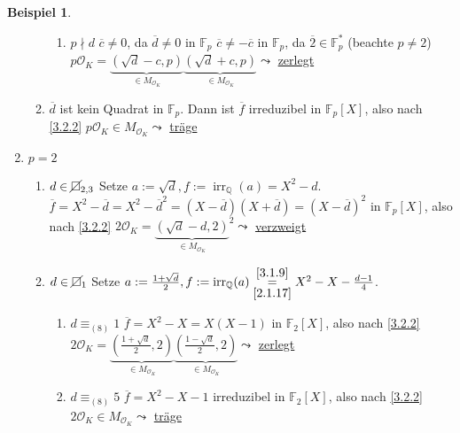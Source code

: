 \documentclass[
twoside=semi,
fontsize=12,
DIV=12, 
cleardoublepage=current,
leqno,
headings=optiontoheadandtoc, 
toc=idx
]{scrbook}
\newcommand{\Q}{\mathbb{Q}}
\newcommand{\F}{\mathbb{F}}
\newcommand{\nsquare}{\cancel{\square}}
\newcommand{\brac}[1]{\left( #1 \right)}
\DeclareMathOperator{\irr}{irr}
\theoremstyle{definition}
\newtheorem{beispiel}[definition]{Beispiel}
\begin{document}
\begin{beispiel}
\begin{enumerate}[label = \underline{Fall \arabic*}]
\begin{enumerate}[label = \underline{Fall 1.\arabic*}]
\begin{enumerate}[label = \underline{Fall 1.1.\arabic*}]
					\item $p\nmid d$\newline
					$\overline{c} \neq 0$, da $\overline{d} \neq 0$ in $\F_p$\newline
					$\overline{c} \neq -\overline{c}$ in $\F_p$, da $\overline{2} \in \F_p^*$ (beachte $p \neq 2$)\newline
					$p\mathcal{O}_K = \underbrace{(\sqrt{d} - c, p)}_{\in M_{\mathcal{O}_K}}\underbrace{(\sqrt{d} + c, p)}_{\in M_{\mathcal{O}_K}} \leadsto$ \underline{zerlegt} 
				\end{enumerate}
				\item $\overline{d}$ ist kein Quadrat in $\F_p$.\newline
				Dann ist $\overline{f}$ irreduzibel in $\F_p[X]$, also nach \ref{3.2.2} $p\mathcal{O}_K \in M_{\mathcal{O}_K} \leadsto$ \underline{tr\"age}
			\end{enumerate}
			\item $p = 2$
			\begin{enumerate}[label = \underline{Fall 2.\arabic*}]
				\item $d \in \nsquare_{2,3}$\newline
				Setze $a := \sqrt{d}, f:= \irr_\Q(a) = X^2 - d$.\newline
				$\overline{f} = X^2 - \overline{d} = X^2 - \overline{d}^2 = (X-\overline{d})(X+\overline{d}) = (X-\overline{d})^2$ in $\F_p[X]$,\newline
				also nach \ref{3.2.2} $2\mathcal{O}_K = {\underbrace{(\sqrt{d} - d, 2)}_{\in M_{\mathcal{O}_K}}}^2 \leadsto$ \underline{verzweigt}
				
				\item $d \in \nsquare_1$\newline
				Setze $a := \frac{1+\sqrt{d}}{2}, f:= \irr_\Q(a) \overset{\ref{3.1.9}}{\underset{\ref{2.1.17}}{=}} X^2 - X- \frac{d-1}{4}$.
				\begin{enumerate}[label = \underline{Fall 2.2.\arabic*}]
					\item $d \equiv_{(8)} 1$\newline
					$\overline{f} = X^2-X = X(X-1)$ in $\F_2[X]$,\newline
					also nach \ref{3.2.2} $2\mathcal{O}_K = \underbrace{\brac{\frac{1+\sqrt{d}}{2}, 2}}_{\in M_{\mathcal{O}_K}}\underbrace{\brac{\frac{1-\sqrt{d}}{2}, 2}}_{\in M_{\mathcal{O}_K}} \leadsto$ \underline{zerlegt}
					
					\item $d \equiv_{(8)} 5$\newline
					$\overline{f} = X^2-X-1$ irreduzibel in $\F_2[X]$, \newline
					also nach \ref{3.2.2} $2\mathcal{O}_K \in M_{\mathcal{O}_K} \leadsto$ \underline{tr\"age}
				\end{enumerate} 
			\end{enumerate}
		\end{enumerate}
 	\end{beispiel}
 
\end{document}
